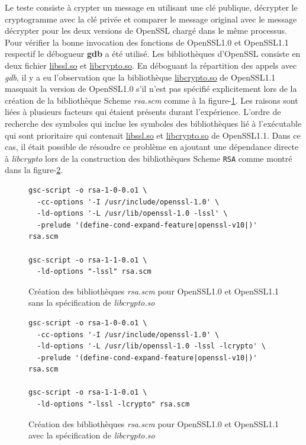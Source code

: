 Le teste consiste à crypter un message en utilisant une clé publique, décrypter le
cryptogramme avec la clé privée et comparer le message original avec le message décrypter
pour les deux versions de OpenSSL chargé dans le même processus. Pour vérifier la bonne
invocation des fonctions de OpenSSL1.0 et OpenSSL1.1 respectif le débogueur \textbf{gdb}
a été utilisé. Les bibliothèques d'OpenSSL consiste en deux fichier \url{libssl.so} et \url{libcrypto.so}.
En déboguant la répartition des appels avec \textit{gdb}, il y a eu l'observation que
la bibliothèque \url{libcrypto.so} de OpenSSL1.1 masquait la version de OpenSSL1.0 s'il
n'est pas spécifié explicitement lors de la création de la bibliothèque Scheme \textit{rsa.scm}
comme à la figure-\ref{fig:scm_masq1}. Les raisons sont liées à plusieurs facteurs qui étaient présents
durant l'expérience. L'ordre de recherche des symboles qui inclue les symboles des bibliothèques lié à
l'exécutable qui sont prioritaire qui contenait \url{libssl.so} et \url{libcrypto.so} de OpenSSL1.1.
Dans ce cas, il était possible de résoudre ce problème en ajoutant une
dépendance directe à \textit{libcrypto} lors de la construction des bibliothèques Scheme \verb+RSA+
comme montré dans la figure-\ref{fig:scm_masq_fix1}.

\begin{center}
\begin{figure}[ht]
\begin{lstlisting}[frame=single]
gsc-script -o rsa-1-0-0.o1 \
  -cc-options '-I /usr/include/openssl-1.0' \
  -ld-options '-L /usr/lib/openssl-1.0 -lssl' \
  -prelude '(define-cond-expand-feature|openssl-v10|)' rsa.scm

gsc-script -o rsa-1-1-0.o1 \
  -ld-options "-lssl" rsa.scm
\end{lstlisting}
\caption{Création des bibliothèques \textit{rsa.scm} pour OpenSSL1.0 et OpenSSL1.1
sans la spécification de \textit{libcrypto.so}}
\label{fig:scm_masq1}
\end{figure}
\end{center}

\begin{center}
\begin{figure}[ht]
\begin{lstlisting}[frame=single]
gsc-script -o rsa-1-0-0.o1 \
  -cc-options '-I /usr/include/openssl-1.0' \
  -ld-options '-L /usr/lib/openssl-1.0 -lssl -lcrypto' \
  -prelude '(define-cond-expand-feature|openssl-v10|)' rsa.scm

gsc-script -o rsa-1-1-0.o1 \
  -ld-options "-lssl -lcrypto" rsa.scm
\end{lstlisting}
\caption{Création des bibliothèques \textit{rsa.scm} pour OpenSSL1.0 et OpenSSL1.1
avec la spécification de \textit{libcrypto.so}}
\label{fig:scm_masq_fix1}
\end{figure}
\end{center}

